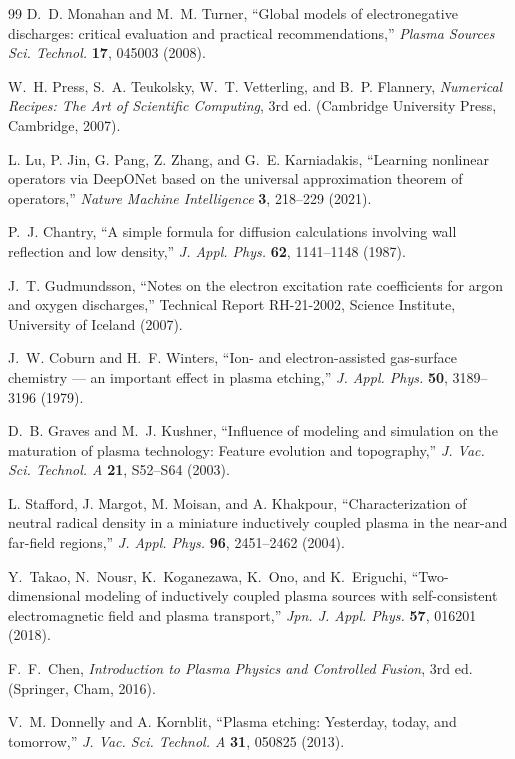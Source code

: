 \documentclass[11pt,a4paper]{report}
\begin{document}
\begin{thebibliography}{99}
D.~D. Monahan and M.~M. Turner,
``Global models of electronegative discharges: critical evaluation and practical recommendations,''
\emph{Plasma Sources Sci. Technol.} \textbf{17}, 045003 (2008).

W.~H. Press, S.~A. Teukolsky, W.~T. Vetterling, and B.~P. Flannery,
\emph{Numerical Recipes: The Art of Scientific Computing},
3rd ed. (Cambridge University Press, Cambridge, 2007).

L. Lu, P. Jin, G. Pang, Z. Zhang, and G.~E. Karniadakis,
``Learning nonlinear operators via DeepONet based on the universal approximation theorem of operators,''
\emph{Nature Machine Intelligence} \textbf{3}, 218--229 (2021).

P.~J. Chantry,
``A simple formula for diffusion calculations involving wall reflection and low density,''
\emph{J. Appl. Phys.} \textbf{62}, 1141--1148 (1987).

J.~T. Gudmundsson,
``Notes on the electron excitation rate coefficients for argon and oxygen discharges,''
Technical Report RH-21-2002, Science Institute, University of Iceland (2007).

J.~W. Coburn and H.~F. Winters,
``Ion- and electron-assisted gas-surface chemistry --- an important effect in plasma etching,''
\emph{J. Appl. Phys.} \textbf{50}, 3189--3196 (1979).

D.~B. Graves and M.~J. Kushner,
``Influence of modeling and simulation on the maturation of plasma technology: Feature evolution and topography,''
\emph{J. Vac. Sci. Technol. A} \textbf{21}, S52--S64 (2003).

L. Stafford, J. Margot, M. Moisan, and A. Khakpour,
``Characterization of neutral radical density in a miniature inductively coupled plasma in the near-and far-field regions,''
\emph{J. Appl. Phys.} \textbf{96}, 2451--2462 (2004).

Y.~Takao, N.~Nousr, K.~Koganezawa, K.~Ono, and K.~Eriguchi,
``Two-dimensional modeling of inductively coupled plasma sources with self-consistent electromagnetic field and plasma transport,''
\emph{Jpn. J. Appl. Phys.} \textbf{57}, 016201 (2018).

F.~F.~Chen,
\emph{Introduction to Plasma Physics and Controlled Fusion},
3rd ed. (Springer, Cham, 2016).

V.~M. Donnelly and A. Kornblit,
``Plasma etching: Yesterday, today, and tomorrow,''
\emph{J. Vac. Sci. Technol. A} \textbf{31}, 050825 (2013).


\end{thebibliography}
\end{document}

